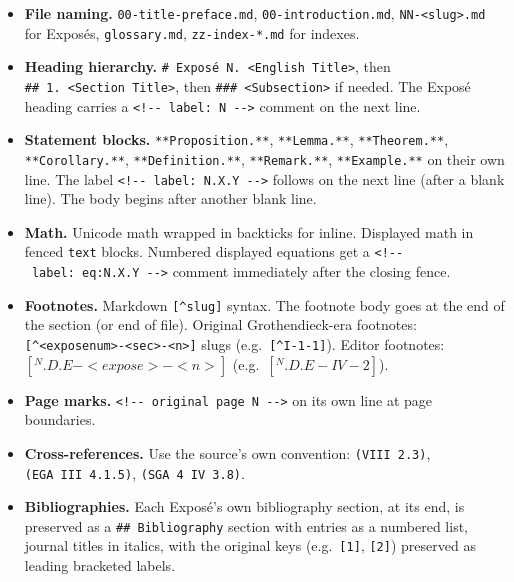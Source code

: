 \documentclass[
]{article}
\providecommand{\tightlist}{%
  \setlength{\itemsep}{0pt}\setlength{\parskip}{0pt}}
\begin{document}
\begin{itemize}
\tightlist
\item
  \textbf{File naming.} \texttt{00-title-preface.md},
  \texttt{00-introduction.md},
  \texttt{NN-\textless{}slug\textgreater{}.md} for Exposés,
  \texttt{glossary.md}, \texttt{zz-index-*.md} for indexes.
\item
  \textbf{Heading hierarchy.}
  \texttt{\#\ Exposé\ N.\ \textless{}English\ Title\textgreater{}}, then
  \texttt{\#\#\ 1.\ \textless{}Section\ Title\textgreater{}}, then
  \texttt{\#\#\#\ \textless{}Subsection\textgreater{}} if needed. The
  Exposé heading carries a
  \texttt{\textless{}!-\/-\ label:\ N\ -\/-\textgreater{}} comment on
  the next line.
\item
  \textbf{Statement blocks.} \texttt{**Proposition.**},
  \texttt{**Lemma.**}, \texttt{**Theorem.**}, \texttt{**Corollary.**},
  \texttt{**Definition.**}, \texttt{**Remark.**}, \texttt{**Example.**}
  on their own line. The label
  \texttt{\textless{}!-\/-\ label:\ N.X.Y\ -\/-\textgreater{}} follows
  on the next line (after a blank line). The body begins after another
  blank line.
\item
  \textbf{Math.} Unicode math wrapped in backticks for inline. Displayed
  math in fenced
  \texttt{\textasciigrave{}\textasciigrave{}\textasciigrave{}text}
  blocks. Numbered displayed equations get a
  \texttt{\textless{}!-\/-\ label:\ eq:N.X.Y\ -\/-\textgreater{}}
  comment immediately after the closing fence.
\item
  \textbf{Footnotes.} Markdown \texttt{{[}\^{}slug{]}} syntax. The
  footnote body goes at the end of the section (or end of file).
  Original Grothendieck-era footnotes:
  \texttt{{[}\^{}\textless{}exposenum\textgreater{}-\textless{}sec\textgreater{}-\textless{}n\textgreater{}{]}}
  slugs (e.g.~\texttt{{[}\^{}I-1-1{]}}). Editor footnotes:
  \([{}^{N}.D.E-<expose>-<n>]\) (e.g.~\([{}^{N}.D.E-IV-2]\)).
\item
  \textbf{Page marks.}
  \texttt{\textless{}!-\/-\ original\ page\ N\ -\/-\textgreater{}} on
  its own line at page boundaries.
\item
  \textbf{Cross-references.} Use the source's own convention:
  \texttt{(VIII\ 2.3)}, \texttt{(EGA\ III\ 4.1.5)},
  \texttt{(SGA\ 4\ IV\ 3.8)}.
\item
  \textbf{Bibliographies.} Each Exposé's own bibliography section, at
  its end, is preserved as a \texttt{\#\#\ Bibliography} section with
  entries as a numbered list, journal titles in italics, with the
  original keys (e.g.~\texttt{{[}1{]}}, \texttt{{[}2{]}}) preserved as
  leading bracketed labels.
\end{itemize}
\end{document}
